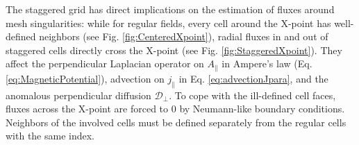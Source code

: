The staggered grid has direct implications on the estimation of fluxes around mesh singularities: while for regular fields, every cell around the X-point has well-defined neighbors (see Fig. \ref{fig:CenteredXpoint}), radial fluxes in and out of staggered cells directly cross the X-point (see Fig. \ref{fig:StaggeredXpoint}). They affect the perpendicular Laplacian operator on $A_\parallel$ in Ampere's law (Eq. \ref{eq:MagneticPotential}), advection on $j_\parallel$ in Eq. \ref{eq:advectionJpara}, and the anomalous perpendicular diffusion $\mathcal{D}_\perp$. To cope with the ill-defined cell faces, fluxes across the X-point are forced to 0 by Neumann-like boundary conditions. Neighbors of the involved cells must be defined separately from the regular cells with the same index. \newline


